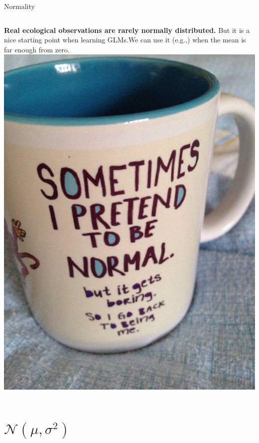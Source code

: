 \documentclass[
  ignorenonframetext,
]{beamer}
\newcommand{\columnsbegin}{\begin{columns}}
\newcommand{\columnsend}{\end{columns}}
\begin{document}
\begin{frame}{Normality}
\protect\hypertarget{normality}{}
\columnsbegin
{}

\textbf{Real ecological observations are rarely normally distributed.}\newline
But it is a nice starting point when learning GLMs.\newline We can use
it (e.g.,) when the mean is far enough from zero. 
\centering \includegraphics{normal.jpeg} \columnsend
\end{frame}

\hypertarget{mathcalnmusigma2}{%
\section{\texorpdfstring{\(\mathcal{N}(\mu,\sigma^2)\)}{\textbackslash mathcal\{N\}(\textbackslash mu,\textbackslash sigma\^{}2)}}\label{mathcalnmusigma2}}
\end{document}
